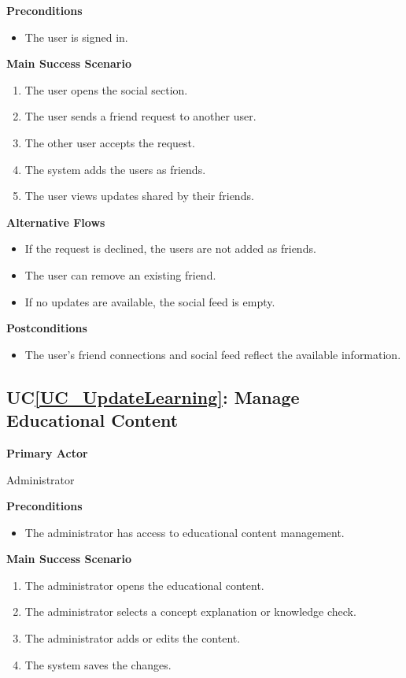 \documentclass[12pt]{article}
\newcounter{ucnum} %
\newcommand{\ucref}[1]{UC\ref{#1}}
\begin{document}
\textbf{Preconditions}
\begin{itemize}
\item The user is signed in.
\end{itemize}

\textbf{Main Success Scenario}
\begin{enumerate}
\item The user opens the social section.
\item The user sends a friend request to another user.
\item The other user accepts the request.
\item The system adds the users as friends.
\item The user views updates shared by their friends.
\end{enumerate}

\textbf{Alternative Flows}
\begin{itemize}
\item If the request is declined, the users are not added as friends.
\item The user can remove an existing friend.
\item If no updates are available, the social feed is empty.
\end{itemize}

\textbf{Postconditions}
\begin{itemize}
\item The user's friend connections and social feed reflect the available information.
\end{itemize}


\label{UC_UpdateLearning}
\subsection{\ucref{UC_UpdateLearning}: Manage Educational Content}

\textbf{Primary Actor}

Administrator

\textbf{Preconditions}
\begin{itemize}
\item The administrator has access to educational content management.
\end{itemize}

\textbf{Main Success Scenario}
\begin{enumerate}
\item The administrator opens the educational content.
\item The administrator selects a concept explanation or knowledge check.
\item The administrator adds or edits the content.
\item The system saves the changes.
\end{enumerate}
\end{document}
